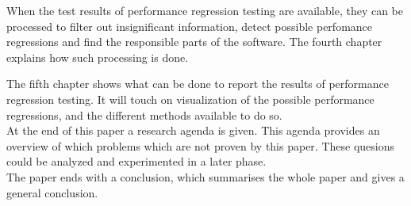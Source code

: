 When the test results of performance regression testing are available, they can be processed to filter out insignificant information, detect possible perfomance regressions and find the responsible parts of the software. The fourth chapter explains how such processing is done. 

The fifth chapter shows what can be done to report the results of performance regression testing. It will touch on visualization of the possible performance regressions, and the different methods available to do so. \\

At the end of this paper a research agenda is given. This agenda provides an overview of which problems which are not proven by this paper. These quesions could be analyzed and experimented in a later phase. \\
The paper ends with a conclusion, which summarises the whole paper and gives a general conclusion. 